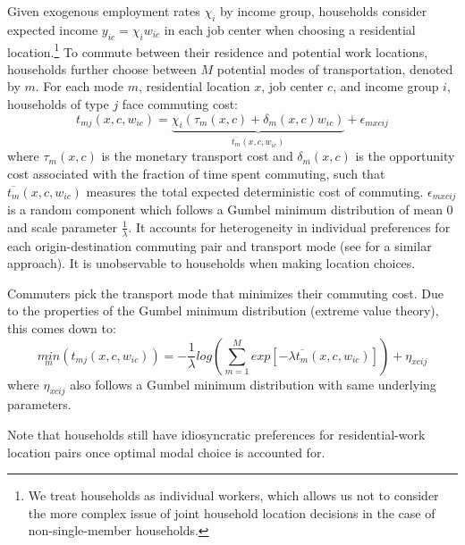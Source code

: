 \documentclass[12pt]{article}
\begin{document}
Given exogenous employment rates $\chi_i$ by income group, households consider expected income $y_{ic}=\chi_iw_{ic}$ in each job center  when choosing a residential location.\footnote{We treat households as individual workers, which allows us not to consider the more complex issue of joint household location decisions in the case of non-single-member households.} To commute between their residence and potential work locations, households further choose between $M$ potential modes of transportation, denoted by $m$. For each mode $m$, residential location $x$, job center $c$, and income group $i$, households of type $j$ face commuting cost:
\begin{equation*}
    t_{mj}(x,c,w_{ic}) = \underbrace{\chi_i \left(\tau_m(x,c) + \delta_m(x,c)w_{ic}\right)}_{\overline{t_{m}}(x,c,w_{ic})} + \epsilon_{mxcij}  
\end{equation*}
where $\tau_m(x,c)$ is the monetary transport cost and $\delta_m(x,c)$ is the opportunity cost associated with the fraction of time spent commuting, such that $\overline{t_{m}}(x,c,w_{ic})$ measures the total expected deterministic cost of commuting. $\epsilon_{mxcij}$ is a random component which follows a Gumbel minimum distribution of mean 0 and scale parameter $\frac{1}{\lambda}$. It accounts for heterogeneity in individual preferences for each origin-destination commuting pair and transport mode (see \citet{teulings2018land} for a similar approach). It is unobservable to households when making location choices.



Commuters pick the transport mode that minimizes their commuting cost. Due to the properties of the Gumbel minimum distribution (extreme value theory), this comes down to:
\begin{equation*}
    \underset{m}{min} \left(t_{mj}(x,c,w_{ic})\right) = -\frac{1}{\lambda}log \left(\sum_{m=1}^{M}exp\left[-\lambda \overline{t_{m}}(x,c,w_{ic}) \right]\right) + \eta_{xcij} 
\end{equation*}
where $\eta_{xcij}$ also follows a Gumbel minimum distribution with same underlying parameters.

Note that households still have idiosyncratic preferences for residential-work location pairs once optimal modal choice is accounted for.
\end{document}
